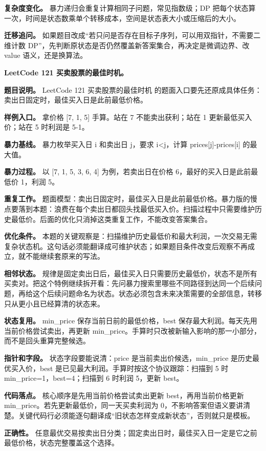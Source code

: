 \textbf{复杂度变化。} 暴力递归会重复计算相同子问题，常见指数级；DP 把每个状态算一次，时间是状态数乘单个转移成本，空间是状态表大小或压缩后的大小。

\textbf{迁移追问。} 如果题目改成“若只问是否存在目标子序列，可以用双指针，不需要二维计数 DP”，先判断原状态是否仍然覆盖新答案集合，再决定是微调边界、改 value 语义，还是换算法。

\noindent\textbf{LeetCode 121 买卖股票的最佳时机。}

\textbf{题目说明。} LeetCode 121 买卖股票的最佳时机 的题面入口要先还原成具体任务：卖出日固定时，最佳买入日是此前最低价格。

\textbf{样例入口。} 拿价格 [7, 1, 5] 手算。站在 7 不能卖出获利；站在 1 更新最低买入价；站在 5 时利润是 5-1。

\textbf{暴力基线。} 暴力枚举买入日 i 和卖出日 j，要求 i<j，计算 prices[j]-prices[i] 的最大值。

\textbf{暴力过程。} 以 [7, 1, 5, 3, 6, 4] 为例，若卖出日在价格 6，最好的买入日是此前最低价 1，利润 5。

\textbf{重复工作。} 题面模型：卖出日固定时，最佳买入日是此前最低价格。暴力版的慢点要落到本题：浪费在每个卖出日都回头找最低买入价。扫描过程中只需要维护历史最低价。后面的优化只消掉这类重复工作，不能改变答案集合。

\textbf{优化条件。} 本题的关键观察是：扫描维护历史最低价和最大利润，一次交易无需复杂状态机。这句话必须能翻译成可维护状态；如果题目条件改变后观察不再成立，就不能继续套原来的写法。

\textbf{相邻状态。} 规律是固定卖出日后，最佳买入日只需要历史最低价，状态不是所有买卖对。把这个特例继续拆开看：先问暴力搜索里哪些不同路径到达同一个后续问题，再给这个后续问题命名为状态。状态必须包含未来决策需要的全部信息，转移只从更小且已经算清的状态来。

\textbf{状态复用。} min\_price 保存当前日前的最低价格，best 保存最大利润。每天先用当前价格尝试卖出，再更新 min\_price。手算时只改被新输入影响的那一小部分，而不是回头重算完整候选。

\textbf{指针和字段。} 状态字段要能说清：price 是当前卖出价候选，min\_price 是历史最优买入价，best 是已见最大利润。手算时按这个协议跟踪：扫描到 5 时 min\_price=1，best=4；扫描到 6 时利润 5，更新 best。

\textbf{代码落点。} 核心顺序是先用当前价格尝试卖出更新 best，再用当前价格更新 min\_price。若先更新最低价，同一天买卖利润为 0，不影响答案但语义要讲清楚。关键代码行必须能逐句翻译成“旧状态怎样变成新状态”，否则就只是模板。

\textbf{正确性。} 任意最优交易按卖出日分类；固定卖出日时，最佳买入日一定是它之前最低价格，状态完整覆盖这个选择。

